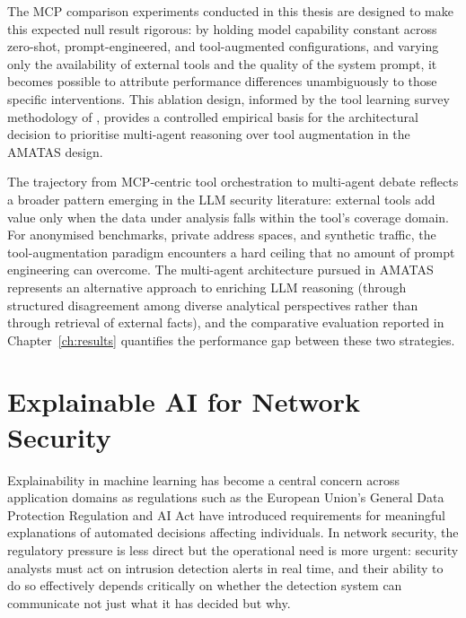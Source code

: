 The MCP comparison experiments conducted in this thesis are designed to make this expected null result rigorous: by holding model capability constant across zero-shot, prompt-engineered, and tool-augmented configurations, and varying only the availability of external tools and the quality of the system prompt, it becomes possible to attribute performance differences unambiguously to those specific interventions. This ablation design, informed by the tool learning survey methodology of \textcite{Qin2024}, provides a controlled empirical basis for the architectural decision to prioritise multi-agent reasoning over tool augmentation in the AMATAS design.

The trajectory from MCP-centric tool orchestration to multi-agent debate reflects a broader pattern emerging in the LLM security literature: external tools add value only when the data under analysis falls within the tool's coverage domain. For anonymised benchmarks, private address spaces, and synthetic traffic, the tool-augmentation paradigm encounters a hard ceiling that no amount of prompt engineering can overcome. The multi-agent architecture pursued in AMATAS represents an alternative approach to enriching LLM reasoning (through structured disagreement among diverse analytical perspectives rather than through retrieval of external facts), and the comparative evaluation reported in Chapter~\ref{ch:results} quantifies the performance gap between these two strategies.

\section{Explainable AI for Network Security}
\label{sec:explainable-ai}

Explainability in machine learning has become a central concern across application domains as regulations such as the European Union's General Data Protection Regulation and AI Act have introduced requirements for meaningful explanations of automated decisions affecting individuals. In network security, the regulatory pressure is less direct but the operational need is more urgent: security analysts must act on intrusion detection alerts in real time, and their ability to do so effectively depends critically on whether the detection system can communicate not just what it has decided but why.

